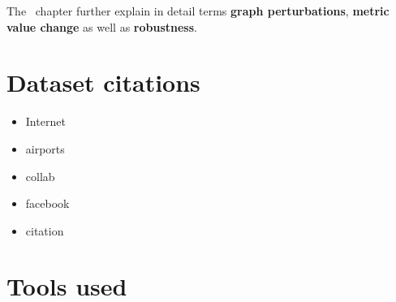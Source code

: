 The~ chapter further explain in detail terms \textbf{graph perturbations}, \textbf{metric value change} as well as \textbf{robustness}.

\section{Dataset citations}

\begin{itemize}
    \item Internet~\cite{konect:zhang05,konect:2016:topology,Kunegis2013}
    \item airports~\cite{konect:2016:opsahl-usairport,konect:opsahl11}
    \item collab~\cite{LeskovecGraphEvolutionDensification2007}
    \item facebook~\cite{NIPS2012_4532}
    \item citation~\cite{LeskovecGraphsTimeDensification2005,GehrkeOverview2003KDD2003}
\end{itemize}

\section{Tools used}

